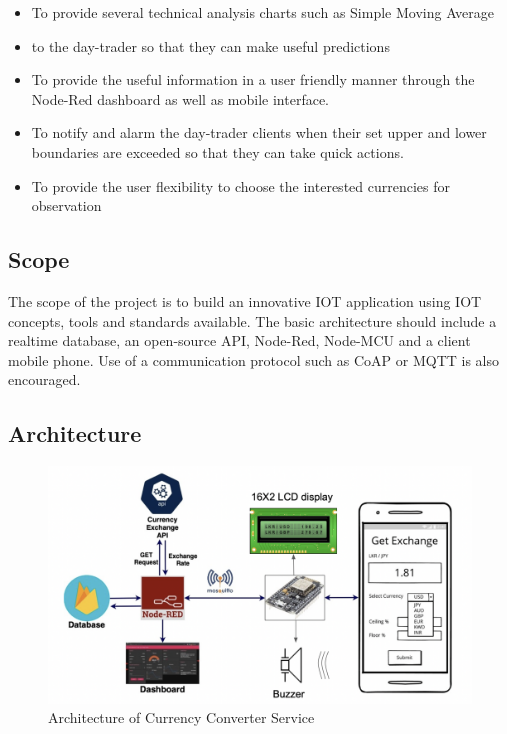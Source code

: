 \begin{itemize}[itemsep=-1.7mm]

\item To provide several technical analysis charts such as Simple Moving Average \item to the day-trader so that they can make useful predictions
\item To provide the useful information in a user friendly manner through the Node-Red dashboard as well as mobile interface.
\item To notify and alarm the day-trader clients when their set upper and lower boundaries are exceeded so that they can take quick actions.
\item To provide the user flexibility to choose the interested currencies for observation


\end{itemize}


\subsection{Scope}

The scope of the project is to build an innovative IOT application using IOT concepts, tools and standards available. The basic architecture should include a realtime database, an open-source API, Node-Red, Node-MCU and a client mobile phone. Use of a communication protocol such as CoAP or MQTT is also encouraged.


\subsection{Architecture}

\begin{figure}[h]
    \centering
      \includegraphics[width=1\textwidth]{images/arch.png}
    \caption{Architecture of Currency Converter Service}
    \label{fig:orgchart}
\end{figure}

